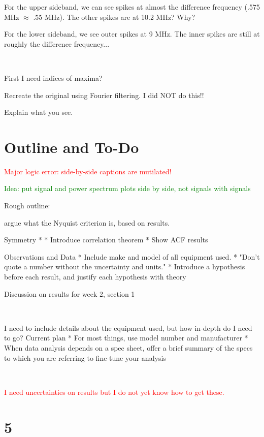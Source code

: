 \documentclass[a4paper]{article}
\begin{document}
For the upper sideband, we can see spikes at almost the difference frequency (.575 MHz $\approx$ .55 MHz). The other spikes are at 10.2 MHz? Why?

For the lower sideband, we see outer spikes at 9 MHz. The inner spikes are still at roughly the difference frequency...

\

First I need indices of maxima?

Recreate the original using Fourier filtering. I did NOT do this!!

Explain what you see.


\section{Outline and To-Do}

\textcolor{red}{Major logic error: side-by-side captions are mutilated!}

\textcolor{green}{Idea: put signal and power spectrum plots side by side, not signals with signals}


Rough outline:

argue what the Nyquist criterion is, based on results.

Symmetry
* 
* Introduce correlation theorem
* Show ACF results

Observations and Data
* Include make and model of all equipment used.
* "Don't quote a number without the uncertainty and units."
* Introduce a hypothesis before each result, and justify each hypothesis with theory


Discussion on results for week 2, section 1

\

I need to include details about the equipment used, but how in-depth do I need to go? Current plan
* For most things, use model number and manufacturer
* When data analysis depends on a spec sheet, offer a brief summary of the specs to which you are referring to fine-tune your analysis

\

\textcolor{red}{I need uncertainties on results but I do not yet know how to get these.}

\section{5}
\end{document}
